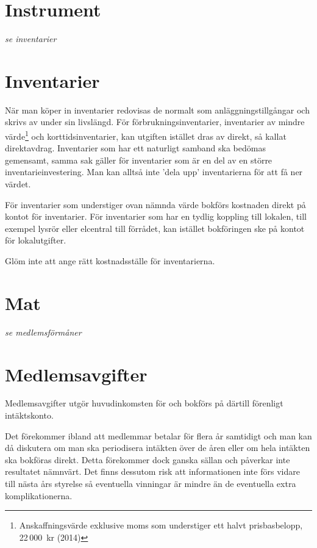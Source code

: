 				\section{Instrument}
				\emph{se inventarier}
			
				\section{Inventarier}
				
				
				När man köper in inventarier redovisas de normalt som anläggningstillgångar och skrivs av under sin livslängd. För förbrukningsinventarier, inventarier av mindre värde\footnote{Anskaffningsvärde exklusive moms som understiger ett halvt prisbasbelopp, 22\,000~kr (2014)} och korttidsinventarier, kan utgiften istället dras av direkt, så kallat direktavdrag. Inventarier som har ett naturligt samband ska bedömas gemensamt, samma sak gäller för inventarier som är en del av en större inventarieinvestering. Man kan alltså inte 'dela upp' inventarierna för att få ner värdet.
		
					\begin{redovisning}
						
		För inventarier som understiger ovan nämnda värde bokförs kostnaden direkt på kontot för inventarier. För inventarier som har en tydlig koppling till lokalen, till exempel lysrör eller elcentral till förrådet, kan istället bokföringen ske på kontot för lokalutgifter.
		
		Glöm inte att ange rätt kostnadsställe för inventarierna.
		
					\end{redovisning}
				
				\section{Mat}
				\emph{se medlemsförmåner}
			
				\section{Medlemsavgifter}
				
				Medlemsavgifter utgör huvudinkomsten för  och bokförs på därtill förenligt intäktskonto.
		
		Det förekommer ibland att medlemmar betalar för flera år samtidigt och man kan då diskutera om man ska periodisera intäkten över de åren eller om hela intäkten ska bokföras direkt. Detta förekommer dock ganska sällan och påverkar inte resultatet nämnvärt. Det finns dessutom risk att informationen inte förs vidare till nästa års styrelse så eventuella vinningar är mindre än de eventuella extra komplikationerna.
		
